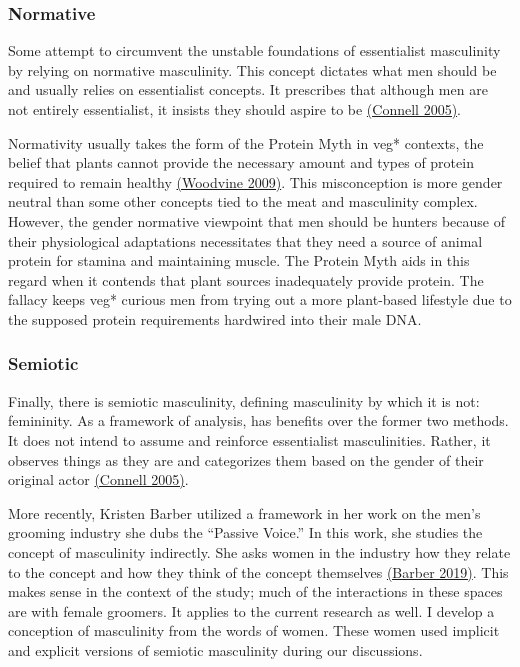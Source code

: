 \documentclass[twoside]{report}
\begin{document}
\begin{multicols*}{2}
\subsubsection{Normative}

Some attempt to circumvent the unstable foundations of essentialist
masculinity by relying on normative masculinity. This concept dictates
what men should be and usually relies on essentialist concepts. It
prescribes that although men are not entirely essentialist, it insists
they should aspire to be \hyperlink{connell}{(Connell 2005)}.

Normativity usually takes the form of the Protein Myth in veg* contexts, the belief that plants cannot provide the necessary amount and types of protein required to remain healthy \hyperlink{woodvine}{(Woodvine 2009)}. This misconception is more gender neutral than some other concepts tied to the meat and masculinity complex. However, the gender normative viewpoint that men should be hunters because of their physiological adaptations necessitates that they need a source of animal protein for stamina and maintaining muscle. The Protein Myth aids in this regard when it contends that plant sources inadequately provide protein. The fallacy keeps veg* curious men from trying out a more plant-based lifestyle due to the supposed protein requirements hardwired into their male DNA.

\subsubsection{Semiotic}

Finally, there is semiotic masculinity, defining masculinity by which it
is not: femininity. As a framework of analysis, has benefits over the
former two methods. It does not intend to assume and reinforce
essentialist masculinities. Rather, it observes things as they are and
categorizes them based on the gender of their original actor \hyperlink{connell}{(Connell
2005)}.

More recently, Kristen Barber utilized a framework in her work on the
men's grooming industry she dubs the ``Passive Voice.'' In this work,
she studies the concept of masculinity indirectly. She asks women in the
industry how they relate to the concept and how they
think of the concept themselves \hyperlink{barber2}{(Barber 2019)}. This makes sense in the context of the study; much of the interactions in these spaces are with female groomers. It applies to the current research as well. I develop a conception of masculinity from the words of women. These women used
implicit and explicit versions of semiotic masculinity during our
discussions.


\end{multicols*}
\end{document}
